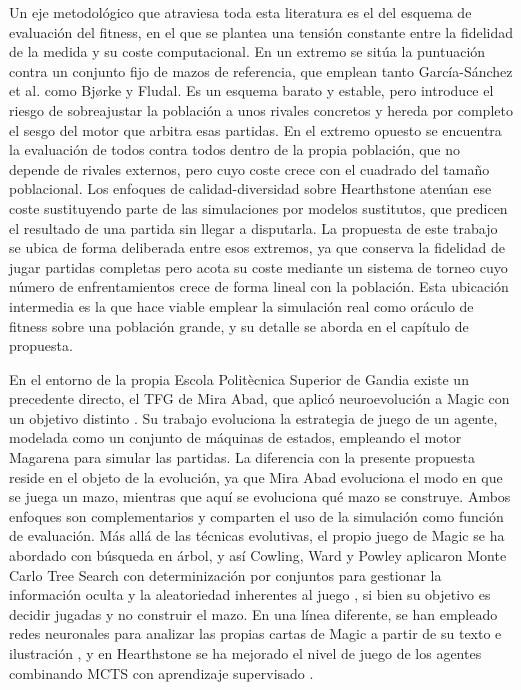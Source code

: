 Un eje metodológico que atraviesa toda esta literatura es el del esquema de evaluación del fitness, en el que se plantea una tensión constante entre la fidelidad de la medida y su coste computacional. En un extremo se sitúa la puntuación contra un conjunto fijo de mazos de referencia, que emplean tanto García-Sánchez et al. como Bjørke y Fludal. Es un esquema barato y estable, pero introduce el riesgo de sobreajustar la población a unos rivales concretos y hereda por completo el sesgo del motor que arbitra esas partidas. En el extremo opuesto se encuentra la evaluación de todos contra todos dentro de la propia población, que no depende de rivales externos, pero cuyo coste crece con el cuadrado del tamaño poblacional. Los enfoques de calidad-diversidad sobre Hearthstone \cite{fontaine2019, zhang2022} atenúan ese coste sustituyendo parte de las simulaciones por modelos sustitutos, que predicen el resultado de una partida sin llegar a disputarla. La propuesta de este trabajo se ubica de forma deliberada entre esos extremos, ya que conserva la fidelidad de jugar partidas completas pero acota su coste mediante un sistema de torneo cuyo número de enfrentamientos crece de forma lineal con la población. Esta ubicación intermedia es la que hace viable emplear la simulación real como oráculo de fitness sobre una población grande, y su detalle se aborda en el capítulo de propuesta.

En el entorno de la propia Escola Politècnica Superior de Gandia existe un precedente directo, el TFG de Mira Abad, que aplicó neuroevolución a Magic con un objetivo distinto \cite{mira2021}. Su trabajo evoluciona la estrategia de juego de un agente, modelada como un conjunto de máquinas de estados, empleando el motor Magarena para simular las partidas. La diferencia con la presente propuesta reside en el objeto de la evolución, ya que Mira Abad evoluciona el modo en que se juega un mazo, mientras que aquí se evoluciona qué mazo se construye. Ambos enfoques son complementarios y comparten el uso de la simulación como función de evaluación. Más allá de las técnicas evolutivas, el propio juego de Magic se ha abordado con búsqueda en árbol, y así Cowling, Ward y Powley aplicaron Monte Carlo Tree Search con determinización por conjuntos para gestionar la información oculta y la aleatoriedad inherentes al juego \cite{cowling2012}, si bien su objetivo es decidir jugadas y no construir el mazo. En una línea diferente, se han empleado redes neuronales para analizar las propias cartas de Magic a partir de su texto e ilustración \cite{zilio2018}, y en Hearthstone se ha mejorado el nivel de juego de los agentes combinando MCTS con aprendizaje supervisado \cite{swiechowski2018}.

